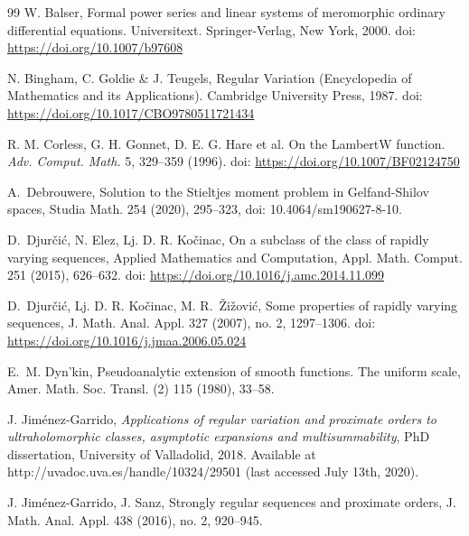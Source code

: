 \documentclass[12pt,leqno]{amsart}
\theoremstyle{plain}
\theoremstyle{definition}
\numberwithin{equation}{section}
\begin{document}
\begin{thebibliography}{99}
 W. Balser, Formal power series and linear systems of meromorphic ordinary differential equations. Universitext. Springer-Verlag, New York, 2000. doi: \href{https://doi.org/10.1007/b97608}{https://doi.org/10.1007/b97608}

 N. Bingham, C. Goldie \& J. Teugels, Regular Variation (Encyclopedia of Mathematics and its Applications). Cambridge University Press, 1987. doi: \href{https://doi.org/10.1017/CBO9780511721434}{https://doi.org/10.1017/CBO9780511721434}

 R. M. Corless, G. H. Gonnet, D. E. G. Hare et al. On the LambertW function. \textit{Adv. Comput. Math.} 5, 329--359 (1996). doi: \href{https://doi.org/10.1007/BF02124750}{https://doi.org/10.1007/BF02124750}

A.~Debrouwere, Solution to the {S}tieltjes moment problem in {G}elfand-{S}hilov spaces, Studia Math. 254 (2020), 295--323, doi: 10.4064/sm190627-8-10.

 D.~Djur\v{c}i\'{c},  N. Elez,  Lj. D. R. Ko\v{c}inac, On a subclass of the class of rapidly varying sequences, Applied Mathematics and Computation, Appl. Math. Comput. 251 (2015), 626--632.
doi: \href{https://doi.org/10.1016/j.amc.2014.11.099}{https://doi.org/10.1016/j.amc.2014.11.099}


 D.~Djur\v{c}i\'{c},  Lj. D. R. Ko\v{c}inac, M. R.~\v{Z}i\v{z}ovi\'{c}, Some properties of rapidly varying sequences, J. Math. Anal. Appl. 327 (2007), no. 2, 1297--1306.   doi: \href{https://doi.org/10.1016/j.jmaa.2006.05.024}{https://doi.org/10.1016/j.jmaa.2006.05.024}



E.~M. Dyn'kin, Pseudoanalytic extension of smooth functions. {T}he uniform scale,
Amer. Math. Soc. Transl. (2) 115 (1980), 33--58.



 J. Jim\'enez-Garrido, \emph{Applications of regular variation and proximate orders to ultraholomorphic classes, asymptotic expansions and multisummability}, PhD dissertation, University of Valladolid, 2018. Available at http://uvadoc.uva.es/handle/10324/29501 (last accessed July 13th, 2020).

 J. Jim\'enez-Garrido, J. Sanz, Strongly regular sequences and
proximate orders, J. Math. Anal. Appl. 438 (2016), no. 2, 920--945.


\end{thebibliography}
\end{document}
